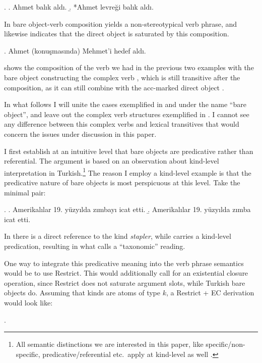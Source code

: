 \documentclass[11pt,a4paper]{article}
\begin{document}
\ex.\label{exbalik2} 
\a.
Ahmet balık aldı.
\b.
*Ahmet levreği balık aldı.

In  bare object-verb composition yields a non-stereotypical verb phrase, and  likewise indicates that the direct object is saturated by this composition.

\ex.
\label{exbalik3}
Ahmet (konuşmasında) Mehmet'i hedef aldı.

 shows the composition of the verb we had in the previous two examples with the bare object  constructing the complex verb , which is still transitive after the composition, as it can still combine with the acc-marked direct object .

In what follows I will unite the cases exemplified in  and  under the name ``bare object'', and leave out the complex verb structures exemplified in . I cannot see any difference between this complex verbs and lexical transitives that would concern the issues under discussion in this paper.

I first establish at an intuitive level that bare objects are predicative rather than referential. The argument is based on an observation about kind-level interpretation in Turkish.\footnote{All semantic distinctions we are interested in this paper, like specific/non-specific, predicative/referential etc.\ apply at kind-level as well .} The reason I employ a kind-level example is that the predicative nature of bare objects is most perspicuous at this level. Take the minimal pair:

\ex.\label{exzimba}
\a. Amerikalılar 19. yüzyılda  zımbayı icat etti.
\b. Amerikalılar 19. yüzyılda zımba icat etti.

In  there is a direct reference to the kind \emph{stapler}, while  carries a kind-level predication, resulting in what  calls a ``taxonomic'' reading.

One way to integrate this predicative meaning into the verb phrase semantics would be to use  Restrict. This would additionally call for an existential closure operation, since Restrict does not saturate argument slots, while Turkish bare objects do. Assuming that kinds are atoms of type $k$, a Restrict + EC derivation would look like:

\ex.

\end{document}
